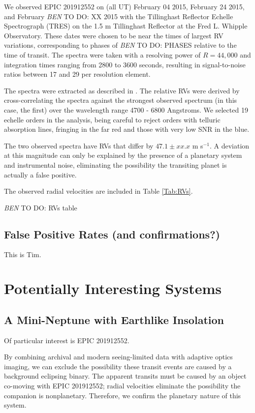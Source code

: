 \documentclass{emulateapj}
\newcommand{\todo}[3]{{\color{#2} \emph{#1} TO DO: #3}}
\newcommand{\btmtodo}[1]{\todo{BEN}{red}{#1}}
\begin{document}
We observed EPIC 201912552 on (all UT) February 04 2015, February 24 2015,
and February \btmtodo{XX} 2015 with the Tillinghast Reflector Echelle
Spectrograph (TRES) on the 1.5 m Tillinghast Reflector at the Fred L.
Whipple Observatory. 
These dates were chosen to be near the times of largest RV variations, 
corresponding to phases of \btmtodo{PHASES} relative to the time
of transit.
The spectra were taken with a resolving power of $R=44,000$ and 
integration times ranging from 2800 to 3600 seconds, resulting in 
signal-to-noise ratios between 17 and 29 per resolution element.

The spectra were extracted as described in \citet{Buchhave10}. 
The relative RVs were derived by cross-correlating the spectra against the
strongest observed spectrum (in this case, the first) over the wavelength
range 4700 - 6800 Angstroms. 
We selected 19 echelle orders in the analysis, being careful to reject
orders with telluric absorption lines, fringing in the far red and those
with very low SNR in the blue.

The two observed spectra have RVs that differ by $47.1 \pm xx.x$ m s$^{-1}$.
A deviation at this magnitude can only be explained by the presence of 
a planetary system and instrumental noise, eliminating the possibility the
transiting planet is actually a false positive.


The observed radial velocities are included in Table \ref{Tab:RVs}.

\btmtodo{RVs table}




\subsection{False Positive Rates (and confirmations?)}
This is Tim.

\section{Potentially Interesting Systems}
\subsection{A Mini-Neptune with Earthlike Insolation}

Of particular interest is EPIC 201912552. 

By combining archival and modern seeing-limited data with adaptive optics 
imaging, we can exclude the possibility these transit events are caused by 
a background eclipsing binary.
The apparent transits must be caused by an object co-moving with EPIC 201912552;
radial velocities eliminate the possibility the companion is nonplanetary.
Therefore, we confirm the planetary nature of this system.
\end{document}

